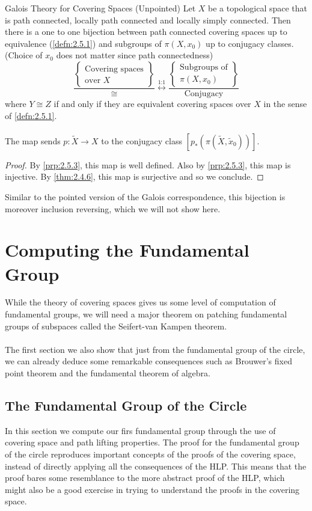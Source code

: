 \documentclass[a4paper]{article}
\begin{document}
\begin{thm}{Galois Theory for Covering Spaces (Unpointed)}{} Let $X$ be a topological space that is path connected, locally path connected and locally simply connected. Then there is a one to one bijection between path connected covering spaces up to equivalence (\ref{defn:2.5.1}) and subgroups of $\pi(X,x_0)$ up to conjugacy classes. (Choice of $x_0$ does not matter since path connectedness) $$\frac{\left\{\substack{\text{Covering spaces}\\\text{over }X}\right\}}{\cong}\overset{\text{1:1}}{\longleftrightarrow}\frac{\left\{\substack{\text{Subgroups of}\\\pi(X,x_0)}\right\}}{\text{Conjugacy}}$$ where $Y\cong Z$ if and only if they are equivalent covering spaces over $X$ in the sense of \ref{defn:2.5.1}. \\~\\

The map sends $p:\tilde{X}\to X$ to the conjugacy class $[p_\ast(\pi(\tilde{X},\tilde{x}_0))]$. \tcbline
\begin{proof}
By \ref{prp:2.5.3}, this map is well defined. Also by \ref{prp:2.5.3}, this map is injective. By \ref{thm:2.4.6}, this map is surjective and so we conclude. 
\end{proof}
\end{thm}

Similar to the pointed version of the Galois correspondence, this bijection is moreover inclusion reversing, which we will not show here. 

\pagebreak
\section{Computing the Fundamental Group}
While the theory of covering spaces gives us some level of computation of fundamental groups, we will need a major theorem on patching fundamental groups of subspaces called the Seifert-van Kampen theorem. \\~\\

The first section we also show that just from the fundamental group of the circle, we can already deduce some remarkable consequences such as Brouwer's fixed point theorem and the fundamental theorem of algebra. 

\subsection{The Fundamental Group of the Circle}
In this section we compute our firs fundamental group through the use of covering space and path lifting properties. The proof for the fundamental group of the circle reproduces important concepts of the proofs of the covering space, instead of directly applying all the consequences of the HLP. This means that the proof bares some resemblance to the more abstract proof of the HLP, which might also be a good exercise in trying to understand the proofs in the covering space. 
\end{document}
